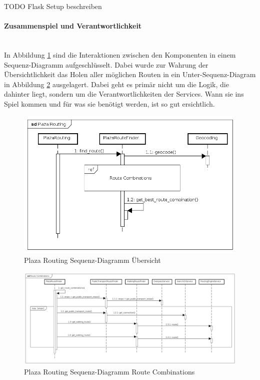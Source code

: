 TODO Flask Setup beschreiben

\paragraph{Zusammenspiel und Verantwortlichkeit}\label{impl:Plaza Routing Zusammenspielund Verantwortlichkeit}~\\
In Abbildung \ref{fig:sequence_diagram_plaza_routing_overview} sind die Interaktionen zwischen den Komponenten in einem Sequenz-Diagramm aufgeschlüsselt. Dabei wurde zur Wahrung der Übersichtlichkeit das Holen aller möglichen Routen in ein Unter-Sequenz-Diagram in Abbildung \ref{fig:sequence_diagram_plaza_routing_route_combs} ausgelagert. Dabei geht es primär nicht um die Logik, die dahinter liegt, sondern um die Verantwortlichkeiten der Services. Wann sie ins Spiel kommen und für was sie benötigt werden, ist so gut ersichtlich.

\begin{figure}[ht]
    \centering
    \includegraphics[width=0.7\linewidth]{projectdoc/img/sequence_diagram_plaza_routing_overview}
    \caption[Plaza Routing Sequenz-Diagramm Übersicht]{Plaza Routing Sequenz-Diagramm Übersicht}
    \label{fig:sequence_diagram_plaza_routing_overview}
\end{figure}

\begin{figure}[ht]
    \centering
    \includegraphics[width=1\linewidth]{projectdoc/img/sequence_diagram_plaza_routing_route_comb}
    \caption[Plaza Routing Sequenz-Diagramm Route Combinations]{Plaza Routing Sequenz-Diagramm Route Combinations}
    \label{fig:sequence_diagram_plaza_routing_route_combs}
\end{figure}

